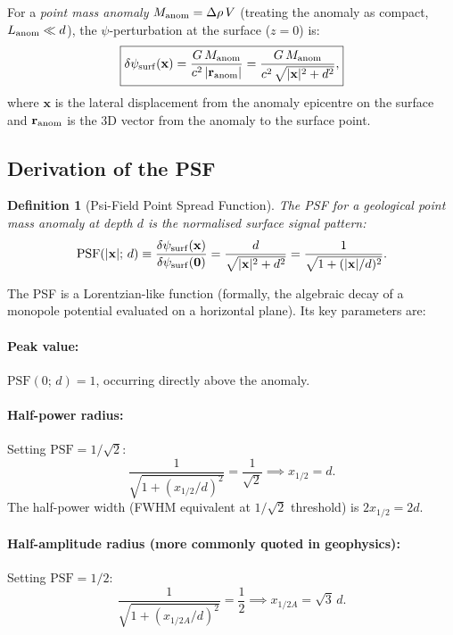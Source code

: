 \documentclass[aps,prd,twocolumn,superscriptaddress,nofootinbib]{revtex4-2}
\newcommand{\PSF}{\mathrm{PSF}}
\newcommand{\drho}{\Delta\rho}
\newtheorem{definition}{Definition}
\begin{document}
For a \emph{point mass anomaly} $M_{\rm anom} = \drho\,V$ (treating
the anomaly as compact, $L_{\rm anom} \ll d$), the $\psi$-perturbation
at the surface ($z = 0$) is:
\begin{equation}
  \boxed{
  \delta\psi_{\rm surf}(\mathbf{x}) = \frac{G\,M_{\rm anom}}{c^2\,|\mathbf{r}_{\rm anom}|}
  = \frac{G\,M_{\rm anom}}{c^2\,\sqrt{|\mathbf{x}|^2 + d^2}},
  }
  \label{eq:psi-point-source}
\end{equation}
where $\mathbf{x}$ is the lateral displacement from the anomaly
epicentre on the surface and $\mathbf{r}_{\rm anom}$ is the 3D
vector from the anomaly to the surface point.

\subsection{Derivation of the PSF}

\begin{definition}[Psi-Field Point Spread Function]
The PSF for a geological point mass anomaly at depth $d$ is the
normalised surface signal pattern:
\begin{equation}
  \PSF(|\mathbf{x}|;\,d) \equiv \frac{\delta\psi_{\rm surf}(\mathbf{x})}
  {\delta\psi_{\rm surf}(\mathbf{0})}
  = \frac{d}{\sqrt{|\mathbf{x}|^2 + d^2}}
  = \frac{1}{\sqrt{1 + (|\mathbf{x}|/d)^2}}.
  \label{eq:psf}
\end{equation}
\end{definition}

The PSF is a Lorentzian-like function (formally, the algebraic
decay of a monopole potential evaluated on a horizontal plane).
Its key parameters are:

\paragraph{Peak value:} $\PSF(0;\,d) = 1$, occurring directly
above the anomaly.

\paragraph{Half-power radius:}
Setting $\PSF = 1/\sqrt{2}$:
\begin{equation}
  \frac{1}{\sqrt{1 + (x_{1/2}/d)^2}} = \frac{1}{\sqrt{2}}
  \implies x_{1/2} = d.
  \label{eq:half-power}
\end{equation}
The half-power width (FWHM equivalent at $1/\sqrt{2}$ threshold)
is $2x_{1/2} = 2d$.

\paragraph{Half-amplitude radius (more commonly quoted in geophysics):}
Setting $\PSF = 1/2$:
\begin{equation}
  \frac{1}{\sqrt{1 + (x_{1/2A}/d)^2}} = \frac{1}{2}
  \implies x_{1/2A} = \sqrt{3}\,d.
  \label{eq:half-amp}
\end{equation}
\end{document}
